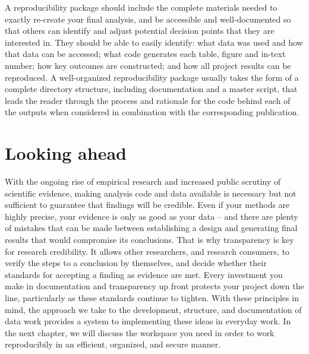 \documentclass[]{tufte-book}
\begin{document}
A reproducibility package should include the complete materials needed
to exactly re-create your final analysis, and be accessible and
well-documented so that others can identify and adjust potential
decision points that they are interested in. They should be able to
easily identify: what data was used and how that data can be accessed;
what code generates each table, figure and in-text number; how key
outcomes are constructed; and how all project results can be reproduced.
A well-organized reproducibility package usually takes the form of a
complete directory structure, including documentation and a master
script, that leads the reader through the process
and rationale for the code behind each of the outputs when considered in
combination with the corresponding publication.

\hypertarget{looking-ahead}{%
\section*{Looking ahead}\label{looking-ahead}}

With the ongoing rise of empirical research and increased public
scrutiny of scientific evidence, making analysis code and data available
is necessary but not sufficient to guarantee that findings will be
credible. Even if your methods are highly precise, your evidence is only
as good as your data -- and there are plenty of mistakes that can be
made between establishing a design and generating final results that
would compromise its conclusions. That is why transparency is key for
research credibility. It allows other researchers, and research
consumers, to verify the steps to a conclusion by themselves, and decide
whether their standards for accepting a finding as evidence are met.
Every investment you make in documentation and transparency up front
protects your project down the line, particularly as these standards
continue to tighten. With these principles in mind, the approach we take
to the development, structure, and documentation of data work provides a
system to implementing these ideas in everyday work. In the next
chapter, we will discuss the workspace you need in order to work
reproducibily in an efficient, organized, and secure manner.
\end{document}
